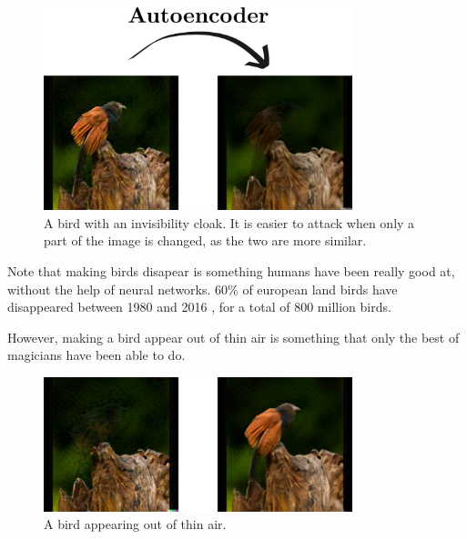 \documentclass[]{scrarticle}
\begin{document}
\begin{figure}[h]
  \centering
  \includegraphics[width=0.8\textwidth]{../images/bird-no-bird.png}
  \caption{
    A bird with an invisibility cloak.
    It is easier to attack when only a part of the image is changed,
    as the two are more similar.
  }
\end{figure}

Note that making birds disapear is something humans have been really good at,
without the help of neural networks.
60\% of european land birds have disappeared between 1980 and 2016
\cite{Rigal2023FarmlandPA}, for a total of 800 million birds.

However, making a bird appear out of thin air is something that
only the best of magicians have been able to do.

\begin{figure}[h]
  \centering
  \includegraphics[width=0.8\textwidth]{../images/bird-resurected.png}
  \caption{
    A bird appearing out of thin air.
  }
\end{figure}







\clearpage


\end{document}
